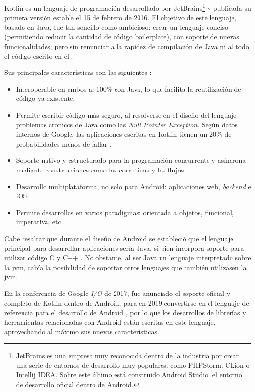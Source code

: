         Kotlin es un lenguaje de programación desarrollado por JetBrains\footnote{JetBrains es una empresa muy reconocida dentro de la industria por crear una serie de entornos de desarrollo muy populares, como PHPStorm, CLion o Intellij IDEA. Sobre este último está construido Android Studio, el entorno de desarrollo oficial dentro de Android.} y publicada su primera versión estable el 15 de febrero de 2016. El objetivo de este lenguaje, basado en Java, fue tan sencillo como ambicioso: crear un lenguaje conciso (permitiendo reducir la cantidad de código \gls{boilerplate}), con soporte de nuevas funcionalidades; pero sin renunciar a la rapidez de compilación de Java ni al todo el código escrito en él \cite{rao_k_history_nodate}. 

        Sus principales características son las siguientes \cite{kotlin_help_kotlin_nodate} \cite{android_developers_enfoque_nodate}:
        \begin{itemize}
            \item Interoperable en ambos al 100\% con Java, lo que facilita la reutilización de código ya existente.
            \item Permite escribir código más seguro, al resolverse en el diseño del lenguaje problemas crónicos de Java como las \textit{Null Pointer Exception}. Según datos internos de Google, las aplicaciones escritas en Kotlin tienen un 20\% de probabilidades menos de fallar \cite{android_developers_enfoque_nodate}.
            \item Soporte nativo y estructurado para la programación concurrente y asíncrona mediante construcciones como las corrutinas y los flujos.
            \item Desarrollo multiplataforma, no solo para Android: aplicaciones web, \textit{backend} e iOS.
            \item Permite desarrollos en varios paradigmas: orientada a objetos, funcional, imperativa, etc.
        \end{itemize}

        Cabe resaltar que durante el diseño de Android se estableció que el lenguaje principal para desarrollar aplicaciones sería Java, si bien incorpora soporte para utilizar código C y C++ \cite{android_developers_como_nodate}. No
        obstante, al ser Java un lenguaje interpretado sobre la \gls{jvm}, cabía la posibilidad de soportar otros lenguajes que también utilizasen la \gls{jvm}.
        
        En la conferencia de Google \textit{I/O} de 2017, fue anunciado el soporte oficial y completo de Kotlin dentro de Android, para en 2019 convertirse en el lenguaje de referencia para el desarrollo de Android \cite{braun_celebrating_2022}, por lo que los desarrollos de librerías y herramientas relacionadas con Android están escritas en este lenguaje, aprovechando al máximo sus nuevas características. 
        
